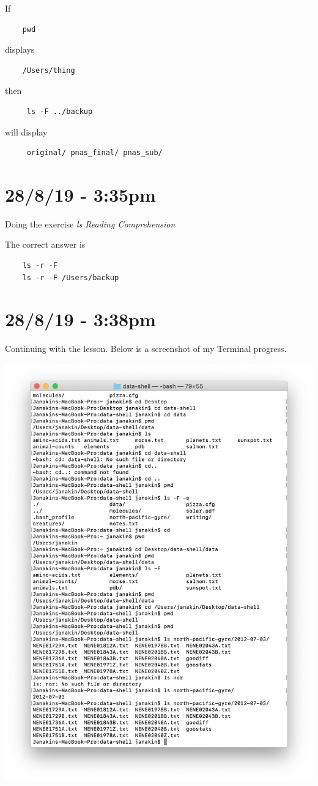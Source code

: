 \documentclass{article}
\begin{document}
If \begin{verbatim}
    pwd
\end{verbatim}
displays \begin{verbatim}
    /Users/thing
\end{verbatim}
 then \begin{verbatim}
     ls -F ../backup
 \end{verbatim} will display
 \begin{verbatim}
     original/ pnas_final/ pnas_sub/
 \end{verbatim}

\section*{28/8/19 - 3:35pm}

Doing the exercise \textit{ls Reading Comprehension}

The correct answer is 
\begin{verbatim}
    ls -r -F
    ls -r -F /Users/backup
\end{verbatim}

\section*{28/8/19 - 3:38pm}

Continuing with the lesson. Below is a screenshot of my Terminal progress.

\includegraphics[width=\textwidth]{figd.png}
\end{document}
